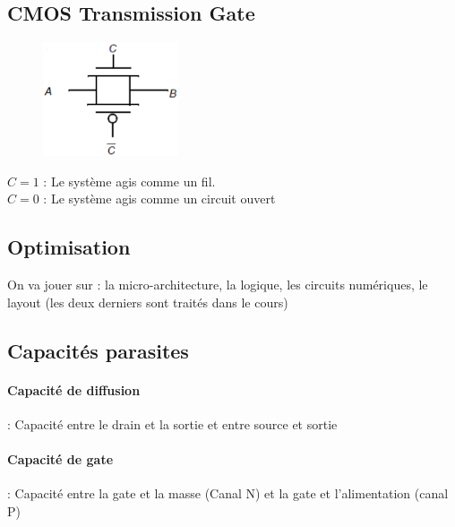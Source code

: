 \documentclass[resume]{subfiles}
\begin{document}
\begin{multicols}{3}
\subsection{CMOS Transmission Gate}
\begin{figure}[H]
\centering
\includegraphics[width=4.00cm]{img_37.png}
\end{figure}
$C=1$ : Le système agis comme un fil.\\
$C=0$ : Le système agis comme un circuit ouvert
\subsection{Optimisation}
On va jouer sur : la micro-architecture, la logique, les circuits numériques, le layout (les deux derniers sont traités dans le cours)
\subsection{Capacités parasites}
\paragraph{Capacité de diffusion} : Capacité entre le drain et la sortie et entre source et sortie
\paragraph{Capacité de gate} : Capacité entre la gate et la masse (Canal N) et la gate et l'alimentation (canal P)

\end{multicols}
\end{document}
